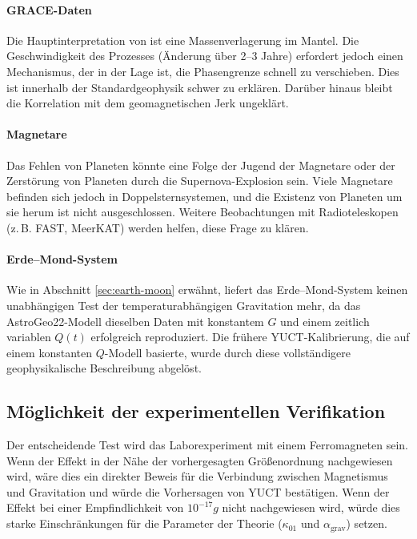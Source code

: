 \documentclass[12pt]{article}
\theoremstyle{remark}
\begin{document}
	\paragraph{GRACE-Daten}
	Die Hauptinterpretation von \cite{Rosat2025} ist eine Massenverlagerung im Mantel. Die Geschwindigkeit des Prozesses (Änderung über 2–3 Jahre) erfordert jedoch einen Mechanismus, der in der Lage ist, die Phasengrenze schnell zu verschieben. Dies ist innerhalb der Standardgeophysik schwer zu erklären. Darüber hinaus bleibt die Korrelation mit dem geomagnetischen Jerk ungeklärt.
	
	\paragraph{Magnetare}
	Das Fehlen von Planeten könnte eine Folge der Jugend der Magnetare oder der Zerstörung von Planeten durch die Supernova-Explosion sein. Viele Magnetare befinden sich jedoch in Doppelsternsystemen, und die Existenz von Planeten um sie herum ist nicht ausgeschlossen. Weitere Beobachtungen mit Radioteleskopen (z. B. FAST, MeerKAT) werden helfen, diese Frage zu klären.
	
	\paragraph{Erde–Mond-System}
	Wie in Abschnitt \ref{sec:earth-moon} erwähnt, liefert das Erde–Mond-System keinen unabhängigen Test der temperaturabhängigen Gravitation mehr, da das AstroGeo22-Modell dieselben Daten mit konstantem $G$ und einem zeitlich variablen $Q(t)$ erfolgreich reproduziert. Die frühere YUCT-Kalibrierung, die auf einem konstanten $Q$-Modell basierte, wurde durch diese vollständigere geophysikalische Beschreibung abgelöst.
	
	\subsection{Möglichkeit der experimentellen Verifikation}
	\label{subsec:discussion-experiment}
	
	Der entscheidende Test wird das Laborexperiment mit einem Ferromagneten sein. Wenn der Effekt in der Nähe der vorhergesagten Größenordnung nachgewiesen wird, wäre dies ein direkter Beweis für die Verbindung zwischen Magnetismus und Gravitation und würde die Vorhersagen von YUCT bestätigen. Wenn der Effekt bei einer Empfindlichkeit von $10^{-17}g$ nicht nachgewiesen wird, würde dies starke Einschränkungen für die Parameter der Theorie ($\kappa_{01}$ und $\alpha_{\text{grav}}$) setzen.
	
\end{document}
